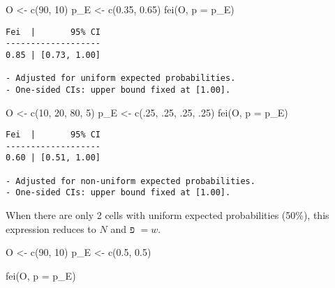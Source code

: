 \documentclass[
]{article}
\newenvironment{Shaded}{\begin{snugshade}}{\end{snugshade}}
\newcommand{\AttributeTok}[1]{\textcolor[rgb]{0.77,0.63,0.00}{#1}}
\newcommand{\DecValTok}[1]{\textcolor[rgb]{0.00,0.00,0.81}{#1}}
\newcommand{\FloatTok}[1]{\textcolor[rgb]{0.00,0.00,0.81}{#1}}
\newcommand{\FunctionTok}[1]{\textcolor[rgb]{0.00,0.00,0.00}{#1}}
\newcommand{\NormalTok}[1]{#1}
\newcommand{\OtherTok}[1]{\textcolor[rgb]{0.56,0.35,0.01}{#1}}
\begin{document}
\begin{Shaded}
\begin{Highlighting}[]
\NormalTok{O }\OtherTok{\textless{}{-}} \FunctionTok{c}\NormalTok{(}\DecValTok{90}\NormalTok{, }\DecValTok{10}\NormalTok{)}
\NormalTok{p\_E }\OtherTok{\textless{}{-}} \FunctionTok{c}\NormalTok{(}\FloatTok{0.35}\NormalTok{, }\FloatTok{0.65}\NormalTok{)}
\FunctionTok{fei}\NormalTok{(O, }\AttributeTok{p =}\NormalTok{ p\_E)}
\end{Highlighting}
\end{Shaded}

\begin{verbatim}
Fei  |       95% CI
-------------------
0.85 | [0.73, 1.00]

- Adjusted for uniform expected probabilities.
- One-sided CIs: upper bound fixed at [1.00].
\end{verbatim}

\begin{Shaded}
\begin{Highlighting}[]
\NormalTok{O }\OtherTok{\textless{}{-}} \FunctionTok{c}\NormalTok{(}\DecValTok{10}\NormalTok{, }\DecValTok{20}\NormalTok{, }\DecValTok{80}\NormalTok{, }\DecValTok{5}\NormalTok{)}
\NormalTok{p\_E }\OtherTok{\textless{}{-}} \FunctionTok{c}\NormalTok{(.}\DecValTok{25}\NormalTok{, .}\DecValTok{25}\NormalTok{, .}\DecValTok{25}\NormalTok{, .}\DecValTok{25}\NormalTok{)}
\FunctionTok{fei}\NormalTok{(O, }\AttributeTok{p =}\NormalTok{ p\_E)}
\end{Highlighting}
\end{Shaded}

\begin{verbatim}
Fei  |       95% CI
-------------------
0.60 | [0.51, 1.00]

- Adjusted for non-uniform expected probabilities.
- One-sided CIs: upper bound fixed at [1.00].
\end{verbatim}

When there are only 2 cells with uniform expected probabilities (50\%),
this expression reduces to \(N\) and פ \(= w\).

\begin{Shaded}
\begin{Highlighting}[]
\NormalTok{O }\OtherTok{\textless{}{-}} \FunctionTok{c}\NormalTok{(}\DecValTok{90}\NormalTok{, }\DecValTok{10}\NormalTok{)}
\NormalTok{p\_E }\OtherTok{\textless{}{-}} \FunctionTok{c}\NormalTok{(}\FloatTok{0.5}\NormalTok{, }\FloatTok{0.5}\NormalTok{)}

\FunctionTok{fei}\NormalTok{(O, }\AttributeTok{p =}\NormalTok{ p\_E)}
\end{Highlighting}
\end{Shaded}
\end{document}

